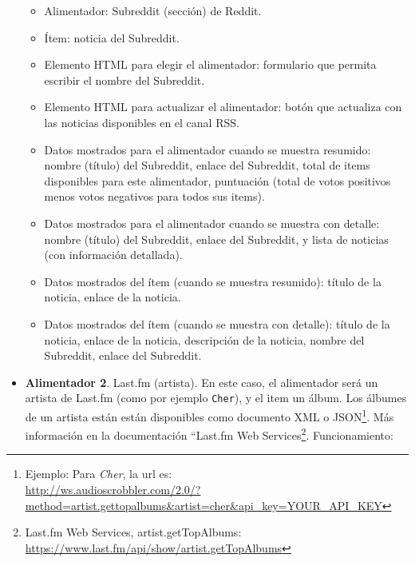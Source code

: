 \begin{itemize}
  \begin{itemize}
  \item Alimentador: Subreddit (sección) de Reddit.
  \item Ítem: noticia del Subreddit.
  \item Elemento HTML para elegir el alimentador: formulario que permita escribir el nombre del Subreddit.
  \item Elemento HTML para actualizar el alimentador: botón que actualiza con las noticias disponibles en el canal RSS.
  \item Datos mostrados para el alimentador cuando se muestra resumido: nombre (título) del Subreddit, enlace del Subreddit, total de items disponibles para este alimentador, puntuación (total de votos positivos menos votos negativos para todos sus items).
  \item Datos mostrados para el alimentador cuando se muestra con detalle: nombre (título) del Subreddit, enlace del Subreddit, y lista de noticias (con información detallada).
  \item Datos mostrados del ítem (cuando se muestra resumido): título de la noticia, enlace de la noticia.
  \item Datos mostrados del ítem (cuando se muestra con detalle): título de la noticia, enlace de la noticia, descripción de la noticia, nombre del Subreddit, enlace del Subreddit.
  \end{itemize}

\item \textbf{Alimentador 2}. Last.fm (artista). En este caso, el alimentador será un artista de Last.fm (como por ejemplo \verb|Cher|), y el item un álbum. Los álbumes de un artista están están disponibles como documento XML o JSON\footnote{Ejemplo: Para \emph{Cher}, la url es:\\ \url{http://ws.audioscrobbler.com/2.0/?method=artist.gettopalbums&artist=cher&api_key=YOUR_API_KEY}}. Más información en la documentación ``Last.fm Web Services\footnote{Last.fm Web Services, artist.getTopAlbums: \\ \url{https://www.last.fm/api/show/artist.getTopAlbums}}. Funcionamiento:


\end{itemize}
